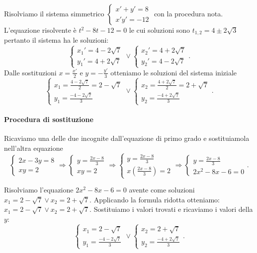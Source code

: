 \begin{exrig}
\begin{esempio}
Risolviamo il sistema simmetrico \(\left\{\begin{array}{l}{x'+y'=8}\\{x'y'=-12}\end{array}\right.\) con la procedura nota. L'equazione risolvente è \(t^2-8t-12=0\) le cui soluzioni sono \(t_{1,2}=4\pm 2\sqrt 3\) pertanto il sistema ha le soluzioni: 
\[\left\{\begin{array}{l}{x_1'=4-2\sqrt 7}\\
{y_1'=4+2\sqrt 7}\end{array}\right.\vee 
\left\{\begin{array}{l}{x_2'=4+2\sqrt 7}\\
{y_2'=4-2\sqrt 7}\end{array}\right..\] 
Dalle sostituzioni \(x=\frac{x'} 2\) e \(y=-\frac{y'} 3\) otteniamo le soluzioni del sistema iniziale 
\[\left\{\begin{array}{l}{x_1=\frac{4-2\sqrt 7} 2=2-\sqrt 7}\\
{y_1=\frac{-4-2\sqrt 7} 3}\end{array}\right.\vee 
\left\{\begin{array}{l}{x_2=\frac{4+2\sqrt 7} 2=2+\sqrt 7}\\
{y_2=\frac{-4+2\sqrt 7} 3}\end{array}\right..\]
\paragraph{Procedura di sostituzione}
Ricaviamo una delle due incognite dall'equazione di primo grado e sostituiamola nell'altra equazione \[ \left\{\begin{array}{l}{2x-3y=8} \\{{xy}=2}\end{array}\right.\Rightarrow\left\{\begin{array}{l}{y=\frac{2x-8} 3}\\{{xy}=2}\end{array}\right.\Rightarrow \left\{\begin{array}{l}{y=\frac{2x-8} 3}\\{x\left(\frac{2x-8} 3\right)=2}\end{array}\right.\Rightarrow \left\{\begin{array}{l}{y=\frac{2x-8} 3}\\{2x^2-8x-6=0}\end{array}\right.. \]

Risolviamo l'equazione \(2x^2-8x-6=0\) avente come soluzioni \(x_1=2-\sqrt 7\vee x_2=2+\sqrt 7\). Applicando la formula ridotta otteniamo: \(x_1=2-\sqrt 7\vee x_2=2+\sqrt 7\).
Sostituiamo i valori trovati e ricaviamo i valori della \(y\): \[ \left\{\begin{array}{l}{x_1=2-\sqrt 7}\\{y_1=\frac{-4-2\sqrt 7} 3}\end{array}\right.\vee \left\{\begin{array}{l}{x_2=2+\sqrt 7}\\{y_2=\frac{-4+2\sqrt 7} 3}\end{array}\right.. \]
\end{esempio}
\end{exrig}
\ovalbox{\risolvi \ref{ese:6.25}}


